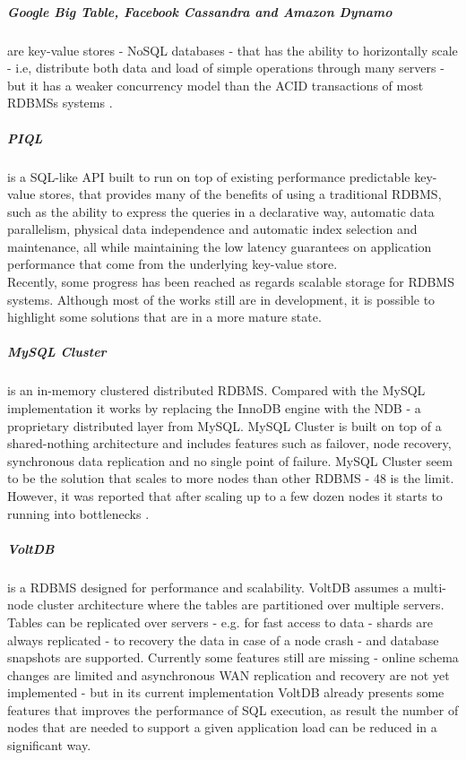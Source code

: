 \subparagraph{Google Big Table, Facebook Cassandra and  Amazon Dynamo} \cite{chang2008bigtable} \cite{lakshman2010cassandra}
\cite{decandia2007dynamo} are key-value stores - \gls{NoSQL} databases - that has the ability to horizontally scale - i.e,
distribute both data and load of simple operations through many servers - but it has a weaker concurrency model
than the ACID transactions of most \glspl{RDBMS} systems \cite{cattell2011scalable}.

\subparagraph{\gls{PIQL}} \cite{armbrust2010piql} is a SQL-like API built to run on top of existing
performance predictable key-value stores, that provides many of the benefits of using a traditional
\gls{RDBMS}, such as the ability to express the queries in a declarative way, automatic data
parallelism, physical data independence and automatic index selection and maintenance, all while
maintaining the low latency guarantees on application performance that come from the underlying
key-value store.\\

Recently, some progress has been reached as regards scalable storage for \gls{RDBMS} systems. Although most
of the works still are in development, it is possible to highlight some solutions that are in a more
mature state.

\subparagraph{MySQL Cluster} \cite{ronstrom2004mysql} is an in-memory clustered distributed \gls{RDBMS}.
Compared with the MySQL implementation it works by replacing the InnoDB engine with the NDB - a proprietary
distributed layer from MySQL. MySQL Cluster is built on top of a shared-nothing architecture and includes
features such as failover, node recovery, synchronous data replication and no single point of failure.
MySQL Cluster seem to be the solution that scales to more nodes than other \gls{RDBMS} - 48 is the limit.
However, it was reported that after scaling up to a few dozen nodes it starts to running into
bottlenecks \cite{bunch2010evaluation}.

\subparagraph{VoltDB} \cite{stonebraker2013voltdb} is a \gls{RDBMS} designed for performance and scalability.
VoltDB assumes a multi-node cluster architecture where the tables are partitioned over multiple servers.
Tables can be replicated over servers - e.g. for fast access to data - shards are always replicated -
to recovery the data in case of a node crash - and database snapshots are supported. Currently some
features still are missing - online schema changes are limited and asynchronous \gls{WAN} replication and
recovery are not yet implemented - but in its current implementation VoltDB already presents some
features that improves the performance of SQL execution, as result the number of nodes that are needed
to support a given application load can be reduced in a significant way.


